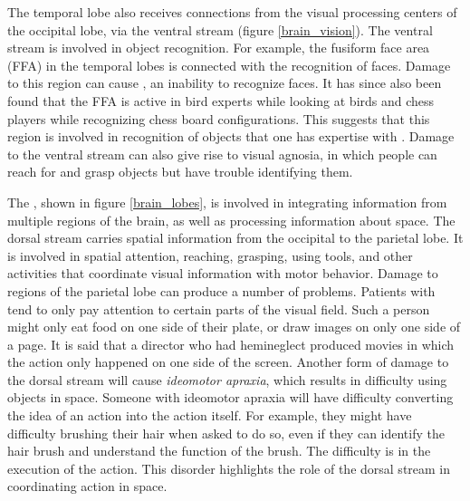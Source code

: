 The  temporal lobe also receives connections from the visual processing centers of the occipital lobe, via the ventral stream (figure \ref{brain_vision}). The ventral stream is involved in object recognition. For example, the fusiform face area (FFA) in the temporal lobes is connected with the recognition of faces. Damage to this region can cause , an inability to recognize faces. It has since also been found that the FFA is active in bird experts while looking at birds and chess players while recognizing chess board configurations. This suggests that this region is involved in recognition of objects that one has expertise with \cite{boggan2011chess}. Damage to the ventral stream can also give rise to visual agnosia, in which people can reach for and grasp objects but have trouble identifying them.

The , shown in figure \ref{brain_lobes}, is involved in integrating information from multiple regions of the brain, as well as processing information about space. The dorsal stream carries spatial information from the occipital to the parietal lobe. It is involved in spatial attention, reaching, grasping, using tools, and other activities that coordinate visual information with motor behavior. Damage to regions of the parietal lobe can produce a number of problems. Patients with  tend to only pay attention to certain parts of the visual field. Such a person might only eat food on one side of their plate, or draw images on only one side of a page. It is said that a director who had hemineglect produced movies in which the action only happened on one side of the screen. Another form of damage to  the dorsal stream will cause \emph{ideomotor apraxia}, which results in difficulty using objects in space. Someone with ideomotor apraxia will have difficulty converting the idea of an action into the action itself. For example, they might have difficulty brushing their hair when asked to do so, even if they can identify the hair brush and understand the function of the brush. The difficulty is in the execution of the action. This disorder highlights the role of the dorsal stream in coordinating action in space.

